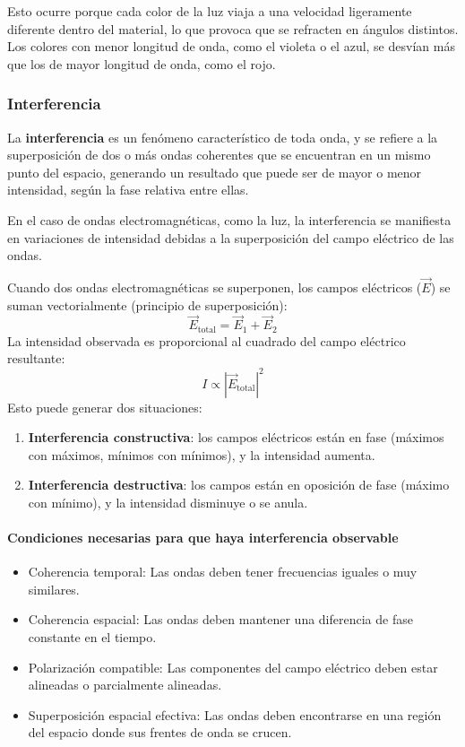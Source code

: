 Esto ocurre porque cada color de la luz viaja a una velocidad ligeramente diferente dentro del material, lo que provoca que se refracten en ángulos distintos. Los colores con menor longitud de onda, como el violeta o el azul, se desvían más que los de mayor longitud de onda, como el rojo.

\subsubsection{Interferencia}

La \textbf{interferencia} es un fenómeno característico de toda onda, y se refiere a la superposición de dos o más ondas coherentes que se encuentran en un mismo punto del espacio, generando un resultado que puede ser de mayor o menor intensidad, según la fase relativa entre ellas.

En el caso de ondas electromagnéticas, como la luz, la interferencia se manifiesta en variaciones de intensidad debidas a la superposición del campo eléctrico de las ondas.

Cuando dos ondas electromagnéticas se superponen, los campos eléctricos (\(\vec{E}\)) se suman vectorialmente (principio de superposición):
\[
\vec{E}_{\text{total}} = \vec{E}_1 + \vec{E}_2
\]
La intensidad observada es proporcional al cuadrado del campo eléctrico resultante:
\[
I \propto |\vec{E}_{\text{total}}|^2
\]
Esto puede generar dos situaciones:
\begin{enumerate}
  \item \textbf{Interferencia constructiva}: los campos eléctricos están en fase (máximos con máximos, mínimos con mínimos), y la intensidad aumenta.
  \item \textbf{Interferencia destructiva}: los campos están en oposición de fase (máximo con mínimo), y la intensidad disminuye o se anula.
\end{enumerate}

\paragraph{Condiciones necesarias para que haya interferencia observable}
\begin{itemize}
  \item Coherencia temporal: Las ondas deben tener frecuencias iguales o muy similares.
  \item Coherencia espacial: Las ondas deben mantener una diferencia de fase constante en el tiempo.
  \item Polarización compatible: Las componentes del campo eléctrico deben estar alineadas o parcialmente alineadas.
  \item Superposición espacial efectiva: Las ondas deben encontrarse en una región del espacio donde sus frentes de onda se crucen.
\end{itemize}


